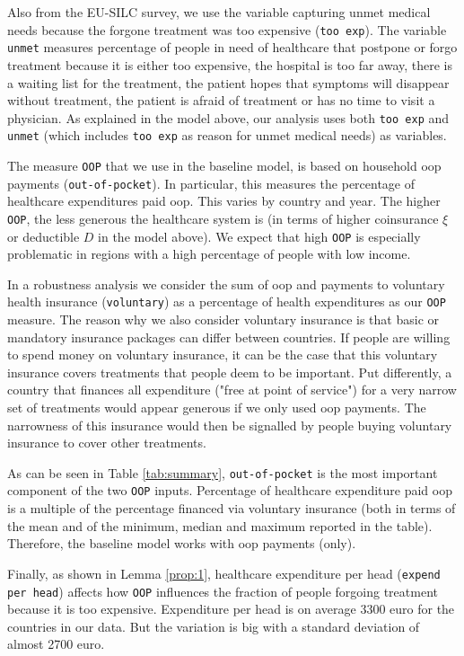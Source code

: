 \documentclass[a4paper,12pt]{article}
\begin{document}
Also from the EU-SILC survey, we use the variable capturing unmet medical needs because the forgone treatment was too expensive (\texttt{too exp}). The variable \texttt{unmet} measures percentage of people in need of healthcare that postpone or forgo treatment because it is either too expensive, the hospital is too far away, there is a waiting list for the treatment, the patient hopes that symptoms will disappear without treatment, the patient is afraid of treatment or has no time to visit a physician. As explained in the model above, our analysis uses both \texttt{too exp}  and \texttt{unmet} (which includes \texttt{too exp} as reason for unmet medical needs) as variables.

The measure \texttt{OOP} that we use in the baseline model, is based on household oop payments (\texttt{out-of-pocket}). In particular, this measures the percentage of healthcare expenditures paid oop. This varies by country and year. The higher \texttt{OOP}, the less generous the healthcare system is (in terms of higher coinsurance \(\xi\) or deductible \(D\) in the model above). We expect that high \texttt{OOP} is especially problematic in regions with a high percentage of people with low income.

In a robustness analysis we consider the sum of oop and payments to voluntary health insurance (\texttt{voluntary}) as a percentage of health expenditures as our \texttt{OOP} measure. The reason why we also consider voluntary insurance is that basic or mandatory insurance packages can differ between countries. If people are willing to spend money on voluntary insurance, it can be the case that this voluntary insurance covers treatments that people deem to be important. Put differently, a country that finances all expenditure ("free at point of service") for a very narrow set of treatments would appear generous if we only used oop payments. The narrowness of this insurance would then be signalled by people buying voluntary insurance to cover other treatments. 

As can be seen in Table \ref{tab:summary}, \texttt{out-of-pocket} is the most important component of the two \texttt{OOP} inputs. Percentage of healthcare expenditure paid oop is a multiple of the percentage financed via voluntary insurance (both in terms of the mean and of the minimum, median and maximum reported in the table). Therefore, the baseline model works with oop payments (only).

Finally, as shown in Lemma \ref{prop:1}, healthcare expenditure per head (\texttt{expend per head}) affects how \texttt{OOP} influences the fraction of people forgoing treatment because it is too expensive. Expenditure per head is on average 3300 euro for the countries in our data. But the variation is big with a standard deviation of almost 2700 euro.
\end{document}
